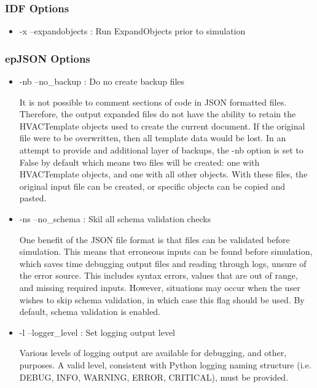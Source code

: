 \subsubsection*{IDF Options}

\begin{itemize}
\item
  -x --expandobjects : Run ExpandObjects prior to simulation
\end{itemize}

\subsubsection*{epJSON Options}\label{pyexpandobjects-cli-epjson-options}

\begin{itemize}
\item
  -nb --no\_backup : Do no create backup files
  
  It is not possible to comment sections of code in JSON formatted files.  Therefore, the output expanded files do not have the ability to retain the HVACTemplate objects used to create the current document.  If the original file were to be overwritten, then all template data would be lost.  In an attempt to provide and additional layer of backups, the -nb option is set to False by default which means two files will be created: one with HVACTemplate objects, and one with all other objects.  With these files, the original input file can be created, or specific objects can be copied and pasted.
\item
  -ns --no\_schema : Skil all schema validation checks
  
  One benefit of the JSON file format is that files can be validated before simulation.  This means that erroneous inputs can be found before simulation, which saves time debugging output files and reading through logs, unsure of the error source.  This includes syntax errors, values that are out of range, and missing required inputs.  However, situations may occur when the user wishes to skip schema validation, in which case this flag should be used.  By default, schema validation is enabled.
  
\item
  -l --logger\_level : Set logging output level 
  
  Various levels of logging output are available for debugging, and other, purposes.  A valid level, consistent with Python logging naming structure (i.e. DEBUG, INFO, WARNING, ERROR, CRITICAL), must be provided.

\end{itemize}

